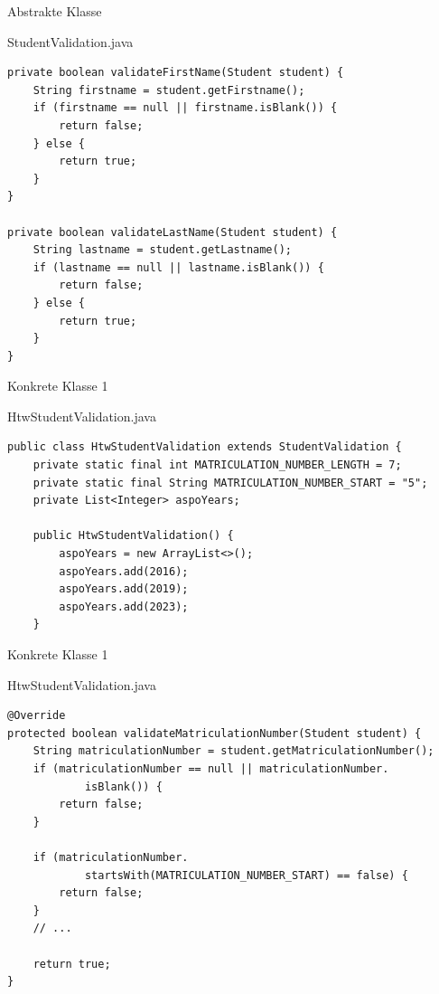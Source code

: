 \begin{frame}[fragile]{Abstrakte Klasse}
	\begin{exampleblock}{StudentValidation.java}
 		\begin{lstlisting}
private boolean validateFirstName(Student student) {
    String firstname = student.getFirstname();
    if (firstname == null || firstname.isBlank()) {
        return false;
    } else {
        return true;
    }
}

private boolean validateLastName(Student student) {
    String lastname = student.getLastname();
    if (lastname == null || lastname.isBlank()) {
        return false;
    } else {
        return true;
    }
}
 		\end{lstlisting}
 	\end{exampleblock}
\end{frame}

\begin{frame}[fragile]{Konkrete Klasse 1}
	\begin{exampleblock}{HtwStudentValidation.java}
 		\begin{lstlisting}
public class HtwStudentValidation extends StudentValidation {
	private static final int MATRICULATION_NUMBER_LENGTH = 7;
	private static final String MATRICULATION_NUMBER_START = "5";
	private List<Integer> aspoYears;
	
	public HtwStudentValidation() {
		aspoYears = new ArrayList<>();
		aspoYears.add(2016);
		aspoYears.add(2019);
		aspoYears.add(2023);
	}
 		\end{lstlisting}
 	\end{exampleblock}
\end{frame}

\begin{frame}[fragile]{Konkrete Klasse 1}
	\begin{exampleblock}{HtwStudentValidation.java}
 		\begin{lstlisting}
@Override
protected boolean validateMatriculationNumber(Student student) {
    String matriculationNumber = student.getMatriculationNumber();
    if (matriculationNumber == null || matriculationNumber.
            isBlank()) {
        return false;
    }
    
    if (matriculationNumber.
            startsWith(MATRICULATION_NUMBER_START) == false) {
        return false;
    }
    // ...
    
    return true;
}
 		\end{lstlisting}
 	\end{exampleblock}
\end{frame}

